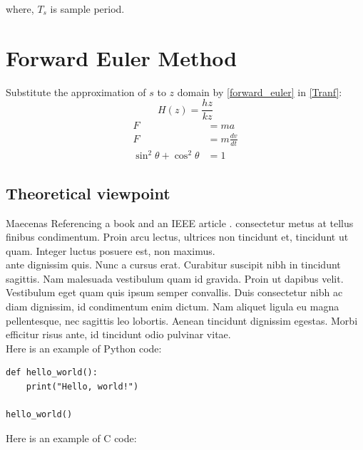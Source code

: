 \documentclass{article}
\begin{document}
where, $T_s$ is sample period.


\section{Forward Euler Method} %
Substitute the approximation of $s$ to $z$ domain by \eqref{forward_euler} in \eqref{Tranf}:
\begin{equation}
H(z)=\dfrac{hz}{kz}
\end{equation}
 \begin{align}
    F &= ma \label{eq:newton} \\
    F &= m\frac{dv}{dt} \label{eq:einstein} \\
    \sin^2 \theta + \cos^2 \theta &= 1 \label{eq:trig}
 \end{align}


\subsection{Theoretical viewpoint}

Maecenas Referencing a book and an IEEE article \cite{example_book, example_ieee}. consectetur metus at tellus finibus condimentum. Proin arcu lectus, ultrices non tincidunt et, tincidunt ut quam. Integer luctus posuere est, non maximus.\\
ante dignissim quis. Nunc a cursus erat. Curabitur suscipit nibh in tincidunt sagittis. Nam malesuada vestibulum quam id gravida. Proin ut dapibus velit. Vestibulum eget quam quis ipsum semper convallis. Duis consectetur nibh ac diam dignissim, id condimentum enim dictum. Nam aliquet ligula eu magna pellentesque, nec sagittis leo lobortis. Aenean tincidunt dignissim egestas. Morbi efficitur risus ante, id tincidunt odio pulvinar vitae.\\
Here is an example of Python code:

\begin{lstlisting}[style=python]
def hello_world():
    print("Hello, world!")

hello_world()
\end{lstlisting}

Here is an example of C code:
\end{document}
